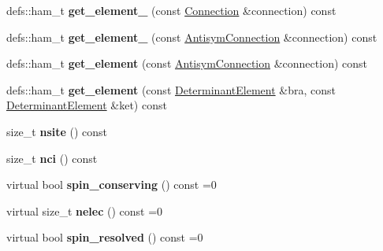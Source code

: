 \begin{DoxyCompactItemize}
\item 
defs\+::ham\+\_\+t {\bfseries get\+\_\+element\+\_} (const \hyperlink{classConnection}{Connection} \&connection) const \hypertarget{classHamiltonian_a15912ad8b283d9ee745f3c2d21a32c40}{}\label{classHamiltonian_a15912ad8b283d9ee745f3c2d21a32c40}

\item 
defs\+::ham\+\_\+t {\bfseries get\+\_\+element\+\_} (const \hyperlink{classAntisymConnection}{Antisym\+Connection} \&connection) const \hypertarget{classHamiltonian_a667e1f7676d5e1e34bb38a4533673f3e}{}\label{classHamiltonian_a667e1f7676d5e1e34bb38a4533673f3e}

\item 
defs\+::ham\+\_\+t {\bfseries get\+\_\+element} (const \hyperlink{classAntisymConnection}{Antisym\+Connection} \&connection) const \hypertarget{classHamiltonian_a2d83c983c71f6dbb10218c7d303fb261}{}\label{classHamiltonian_a2d83c983c71f6dbb10218c7d303fb261}

\item 
defs\+::ham\+\_\+t {\bfseries get\+\_\+element} (const \hyperlink{classDeterminantElement}{Determinant\+Element} \&bra, const \hyperlink{classDeterminantElement}{Determinant\+Element} \&ket) const \hypertarget{classHamiltonian_a351f134025885998d632c86227f1da15}{}\label{classHamiltonian_a351f134025885998d632c86227f1da15}

\item 
size\+\_\+t {\bfseries nsite} () const \hypertarget{classHamiltonian_a4e12daf4f223b7ff2c82078a709aabac}{}\label{classHamiltonian_a4e12daf4f223b7ff2c82078a709aabac}

\item 
size\+\_\+t {\bfseries nci} () const \hypertarget{classHamiltonian_a7ec2da6325e8eda1023f67d63c8c0a35}{}\label{classHamiltonian_a7ec2da6325e8eda1023f67d63c8c0a35}

\item 
virtual bool {\bfseries spin\+\_\+conserving} () const =0\hypertarget{classHamiltonian_ac74a988992ec2108d1fd0ef4455c810c}{}\label{classHamiltonian_ac74a988992ec2108d1fd0ef4455c810c}

\item 
virtual size\+\_\+t {\bfseries nelec} () const =0\hypertarget{classHamiltonian_a6fad47832ce13f6b36232f4c653aa04f}{}\label{classHamiltonian_a6fad47832ce13f6b36232f4c653aa04f}

\item 
virtual bool {\bfseries spin\+\_\+resolved} () const =0\hypertarget{classHamiltonian_a0499e9bce6f7adacce98cef9c0d124b1}{}\label{classHamiltonian_a0499e9bce6f7adacce98cef9c0d124b1}


\end{DoxyCompactItemize}
